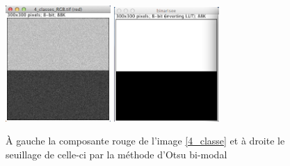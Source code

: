 \documentclass[a4paper,10pt]{article}
\begin{document}
\begin{figure}[ht]
\begin{center}
	\includegraphics[width=4cm]{images/4_classe_rouge}
	\includegraphics[width=4cm]{images/4_classe_binaire}
\end{center}
	\caption{\`A gauche la composante rouge de l'image \ref{4_classe} et \`a droite le seuillage de celle-ci par la m\'ethode d'Otsu bi-modal}
	\label{4_classe_gris_rouge}
\end{figure}
\end{document}
